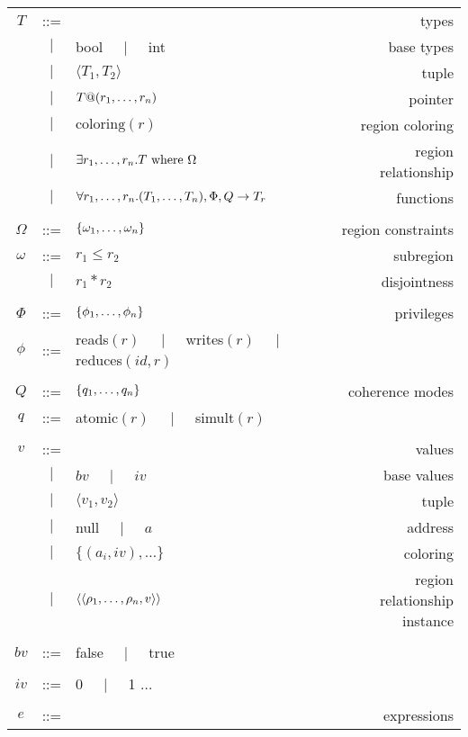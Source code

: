 \begin{table*}
\centering
{\small
\begin{tabular}{cclr}

$T$ & ::= &  & types \\
  &$\mid$& bool $\;\;\;\mid\;\;\;$ int & base types \\
  &$\mid$& $\langle T_1, T_2 \rangle$ & tuple \\
  &$\mid$& $T@({r}_1,\ldots,{r}_n)$ & pointer \\
  &$\mid$& $\text{coloring}(r)$ & region coloring \\
  &$\mid$& $\exists {r}_1,\ldots,{r}_n. T\text{ where }\Omega$ & region relationship \\
  &$\mid$& $\forall {r}_1,\ldots,{r}_n. ({T}_1,\ldots,{T}_n), \Phi, Q \rightarrow T_r$ & functions \\
\\
$\Omega$ & ::= & $\{ {\omega}_1,\ldots,{\omega}_n \}$ & region constraints \\
$\omega$ & ::= & $r_1 \leq r_2$ & subregion \\
  &$\mid$& $r_1 * r_2$ & disjointness \\
\\
$\Phi$ & ::= & $\{ {\phi}_1,\ldots,{\phi}_n \}$ & privileges \\
$\phi$ & ::= & reads$(r)$ $\;\;\;\mid\;\;\;$ writes$(r)$ $\;\;\;\mid\;\;\;$ reduces$(id,r)$ & \\
\\
$Q$ & ::= & $\{ {q}_1,\ldots,{q}_n \}$ & coherence modes \\
$q$ & ::= & atomic$(r)$ $\;\;\;\mid\;\;\;$ simult$(r)$ & \\
\\
$v$ & ::= & & values \\
  &$\mid$& $bv$ $\;\;\;\mid\;\;\;$ $iv$ & base values \\
  &$\mid$& $\langle v_1, v_2 \rangle$ & tuple \\
  &$\mid$& null $\;\;\;\mid\;\;\;$ $a$ & address \\
  &$\mid$& $\{ (a_i, iv), \ldots \}$ & coloring \\
  &$\mid$& $\langle \langle {\rho}_1,\ldots,{\rho}_n, v\rangle \rangle$ & region relationship instance \\
\\
$bv$ & ::= & false $\;\;\;\mid\;\;\;$ true \\
\\
$iv$ & ::= & 0 $\;\;\;\mid\;\;\;$ 1 $\ldots$ \\
\\
$e$ & ::= & & expressions \\

\end{tabular}}
\end{table*}
